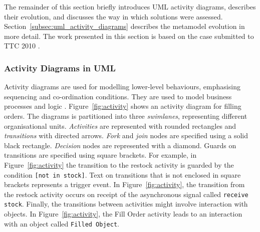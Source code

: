The remainder of this section briefly introduces UML activity diagrams, describes their evolution, and discusses the way in which solutions were assessed. Section~\ref{subsec:uml_activity_diagrams} describes the metamodel evolution in more detail. The work presented in this section is based on the case submitted to TTC 2010 \cite{rose10ttc_case}. 

\subsubsection{Activity Diagrams in UML}
Activity diagrams are used for modelling lower-level behaviours, emphasising sequencing and co-ordination conditions. They are used to model business processes and logic \cite{uml22}. Figure~\ref{fig:activity} shows an activity diagram for filling orders. The diagrams is partitioned into three \emph{swimlanes}, representing different organisational units. \emph{Activities} are represented with rounded rectangles and \emph{transitions} with directed arrows. \emph{Fork} and \emph{join} nodes are specified using a solid black rectangle. \emph{Decision} nodes are represented with a diamond. Guards on transitions are specified using square brackets. For example, in Figure~\ref{fig:activity} the transition to the restock activity is guarded by the condition \texttt{[not in stock]}. Text on transitions that is not enclosed in square brackets represents a trigger event. In Figure~\ref{fig:activity}, the transition from the restock activity occurs on receipt of the asynchronous signal called \texttt{receive stock}. Finally, the transitions between activities might involve interaction with objects. In Figure~\ref{fig:activity}, the Fill Order activity leads to an interaction with an object called \texttt{Filled Object}. 

